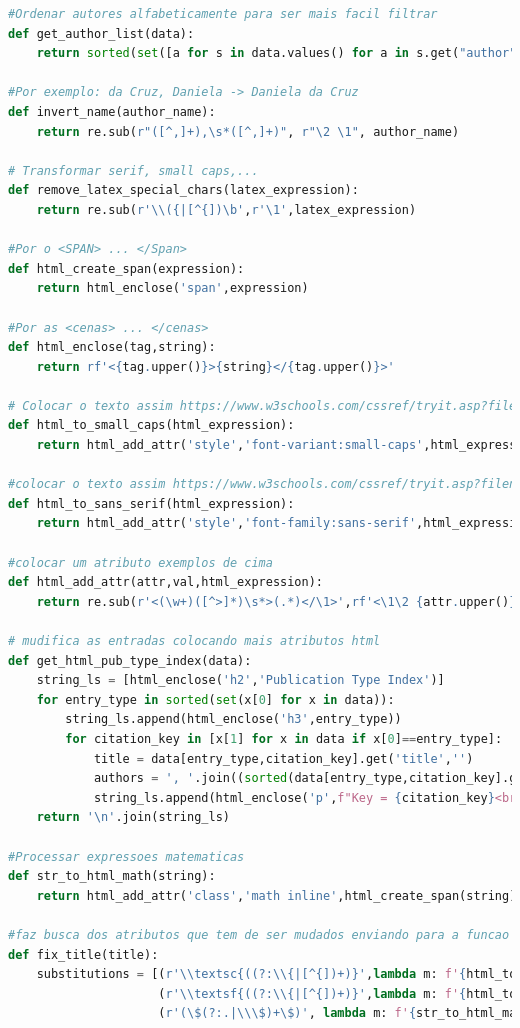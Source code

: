 \documentclass[11pt,a4paper]{report}
\begin{document}
\begin{lstlisting}[language=python]
#Ordenar autores alfabeticamente para ser mais facil filtrar
def get_author_list(data):
    return sorted(set([a for s in data.values() for a in s.get("author", [])]))

#Por exemplo: da Cruz, Daniela -> Daniela da Cruz
def invert_name(author_name):
    return re.sub(r"([^,]+),\s*([^,]+)", r"\2 \1", author_name)

# Transformar serif, small caps,... 
def remove_latex_special_chars(latex_expression):
    return re.sub(r'\\({|[^{])\b',r'\1',latex_expression)

#Por o <SPAN> ... </Span>
def html_create_span(expression):
    return html_enclose('span',expression)

#Por as <cenas> ... </cenas>
def html_enclose(tag,string):
    return rf'<{tag.upper()}>{string}</{tag.upper()}>'

# Colocar o texto assim https://www.w3schools.com/cssref/tryit.asp?filename=trycss_font-variant
def html_to_small_caps(html_expression):
    return html_add_attr('style','font-variant:small-caps',html_expression)

#colocar o texto assim https://www.w3schools.com/cssref/tryit.asp?filename=trycss_font-family
def html_to_sans_serif(html_expression):
    return html_add_attr('style','font-family:sans-serif',html_expression)

#colocar um atributo exemplos de cima
def html_add_attr(attr,val,html_expression):
    return re.sub(r'<(\w+)([^>]*)\s*>(.*)</\1>',rf'<\1\2 {attr.upper()}="{val}">\3</\1>',html_expression)

# mudifica as entradas colocando mais atributos html
def get_html_pub_type_index(data):
    string_ls = [html_enclose('h2','Publication Type Index')]
    for entry_type in sorted(set(x[0] for x in data)):
        string_ls.append(html_enclose('h3',entry_type))
        for citation_key in [x[1] for x in data if x[0]==entry_type]:
            title = data[entry_type,citation_key].get('title','')
            authors = ', '.join((sorted(data[entry_type,citation_key].get('author',''))))
            string_ls.append(html_enclose('p',f"Key = {citation_key}<br>Title = {fix_title(title)}<br>Autores = {authors}"))
    return '\n'.join(string_ls)

#Processar expressoes matematicas
def str_to_html_math(string):
    return html_add_attr('class','math inline',html_create_span(string))

#faz busca dos atributos que tem de ser mudados enviando para a funcao que as realiza
def fix_title(title):
    substitutions = [(r'\\textsc{((?:\\{|[^{])+)}',lambda m: f'{html_to_small_caps(html_create_span(m.group(1)))}'),
                     (r'\\textsf{((?:\\{|[^{])+)}',lambda m: f'{html_to_sans_serif(html_create_span(m.group(1)))}'),
                     (r'(\$(?:.|\\\$)+\$)', lambda m: f'{str_to_html_math(m.group(1))}')]



\end{lstlisting}
\end{document}
